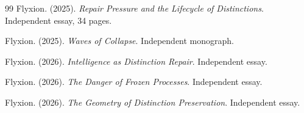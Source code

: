 \documentclass[11pt, a4paper]{article}
\theoremstyle{plain}
\theoremstyle{definition}
\theoremstyle{remark}
\begin{document}
\begin{thebibliography}{99}
Flyxion. (2025).
\textit{Repair Pressure and the Lifecycle of Distinctions}.
Independent essay, 34 pages.

Flyxion. (2025).
\textit{Waves of Collapse}.
Independent monograph.

Flyxion. (2026).
\textit{Intelligence as Distinction Repair}.
Independent essay.

Flyxion. (2026).
\textit{The Danger of Frozen Processes}.
Independent essay.

Flyxion. (2026).
\textit{The Geometry of Distinction Preservation}.
Independent essay.

\end{thebibliography}
\end{document}
